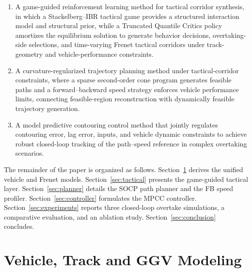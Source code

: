 \documentclass{iopjournal}
\begin{document}
\begin{enumerate}
    \item A game-guided reinforcement learning method for tactical corridor
    synthesis, in which a Stackelberg--IBR tactical game provides a structured
    interaction model and structural prior, while a Truncated Quantile Critics
    policy amortizes the equilibrium solution to generate behavior decisions,
    overtaking-side selections, and time-varying Frenet tactical corridors
    under track-geometry and vehicle-performance constraints.

    \item A curvature-regularized trajectory planning method under
    tactical-corridor constraints, where a sparse second-order cone program
    generates feasible paths and a forward--backward speed strategy enforces
    vehicle performance limits, connecting feasible-region reconstruction with
    dynamically feasible trajectory generation.

    \item A model predictive contouring control method that jointly regulates
    contouring error, lag error, inputs, and vehicle dynamic constraints to
    achieve robust closed-loop tracking of the path--speed reference in complex
    overtaking scenarios.
\end{enumerate}



The remainder of the paper is organized as follows.
Section~\ref{sec:model} derives the unified vehicle and Frenet models.
Section~\ref{sec:tactical} presents the game-guided tactical layer.
Section~\ref{sec:planner} details the SOCP path planner and the FB speed
profiler.
Section~\ref{sec:controller} formulates the MPCC controller.
Section~\ref{sec:experiments} reports three closed-loop overtake simulations,
a comparative evaluation, and an ablation study.
Section~\ref{sec:conclusion} concludes.

\section{Vehicle, Track and GGV Modeling}\label{sec:model}
\end{document}
